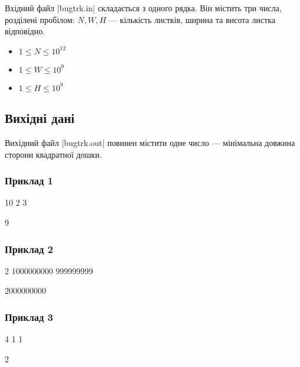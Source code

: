 \documentclass[12pt,a4paper]{article}
\begin{document}
Вхідний файл |bugtrk.in| складається з одного рядка.
Він містить три числа, розділені пробілом: \(N, W, H\) --- кількість листків, ширина та висота листка відповідно.

\begin{itemize}
    \item \(1 \leq N \leq 10^{12} \)
    \item \(1 \leq W \leq 10^{9} \)
    \item \(1 \leq H \leq 10^{9} \)
\end{itemize}


\subsection*{Вихідні дані}

Вихідний файл |bugtrk.out| повинен містити одне число --- мінімальна довжина сторони квадратної дошки.


\pagebreak


\subsubsection*{Приклад 1}

\textbf{}

\begin{codeblock}
10 2 3
\end{codeblock}

\textbf{}

\begin{codeblock}
9
\end{codeblock}


\subsubsection*{Приклад 2}

\textbf{}

\begin{codeblock}
2 1000000000 999999999
\end{codeblock}

\textbf{}

\begin{codeblock}
2000000000
\end{codeblock}


\subsubsection*{Приклад 3}

\textbf{}

\begin{codeblock}
4 1 1
\end{codeblock}

\textbf{}

\begin{codeblock}
2
\end{codeblock}
\end{document}
